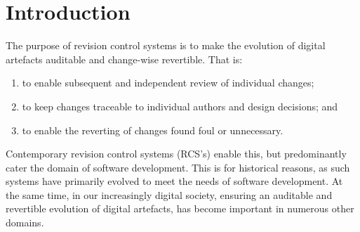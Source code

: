 \section{Introduction}

The purpose of revision control systems is to make the evolution of
digital artefacts auditable and change-wise revertible. That is:

\begin{enumerate}

\item to enable subsequent and independent review of individual
changes;

\item to keep changes traceable to individual authors and design
decisions; and

\item to enable the reverting of changes found foul or unnecessary.

\end{enumerate}

Contemporary revision control systems (RCS's) enable this, but
predominantly cater the domain of software development. This is for
historical reasons, as such systems have primarily evolved to meet the
needs of software development\cite{Rochkind:1975, Tichy:1982}. At the
same time, in our increasingly digital society, ensuring an auditable
and revertible evolution of digital artefacts, has become important in
numerous other domains.

